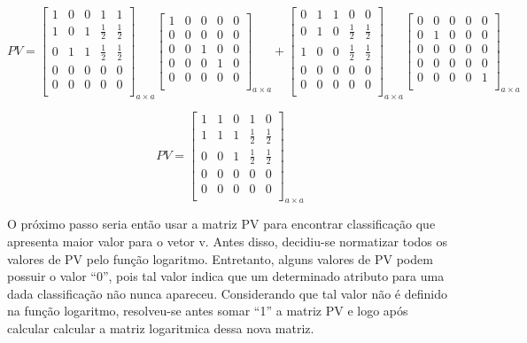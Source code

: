 \begin{anexosenv}
$$PV=
\left[
\begin{array}{ccccc}
1 & 0 & 0 & 1 & 1 \\
1 & 0 & 1 & \frac{1}{2} & \frac{1}{2} \\
0 & 1 & 1 & \frac{1}{2} & \frac{1}{2} \\
0 & 0 & 0 & 0 & 0 \\
0 & 0 & 0 & 0 & 0 \\
\end{array}
\right]_{a \times a}
\left[
\begin{array}{ccccc}
1 & 0 & 0 & 0 & 0 \\
0 & 0 & 0 & 0 & 0 \\
0 & 0 & 1 & 0 & 0 \\
0 & 0 & 0 & 1 & 0 \\
0 & 0 & 0 & 0 & 0 \\
\end{array}
\right]_{a \times a}
+
\left[
\begin{array}{ccccc}
0 & 1 & 1 & 0 & 0 \\
0 & 1 & 0 & \frac{1}{2} & \frac{1}{2} \\
1 & 0 & 0 & \frac{1}{2} & \frac{1}{2} \\
0 & 0 & 0 & 0 & 0 \\
0 & 0 & 0 & 0 & 0 \\
\end{array}
\right]_{a \times a}
\left[
\begin{array}{ccccc}
0 & 0 & 0 & 0 & 0 \\
0 & 1 & 0 & 0 & 0 \\
0 & 0 & 0 & 0 & 0 \\
0 & 0 & 0 & 0 & 0 \\
0 & 0 & 0 & 0 & 1 \\
\end{array}
\right]_{a \times a}
$$

$$PV=\left[
\begin{array}{ccccc}
1 & 1 & 0 & 1 & 0 \\
1 & 1 & 1 & \frac{1}{2} & \frac{1}{2} \\
0 & 0 & 1 & \frac{1}{2} & \frac{1}{2} \\
0 & 0 & 0 & 0 & 0 \\
0 & 0 & 0 & 0 & 0 \\
\end{array}
\right]_{a \times a}$$

O próximo passo seria então usar a matriz PV para encontrar classificação que
apresenta maior valor para o vetor v. Antes disso, decidiu-se normatizar todos
os valores de PV pelo função logaritmo. Entretanto, alguns valores de PV podem
possuir o valor ``0'', pois tal valor indica que um determinado atributo para
uma dada classificação não nunca apareceu. Considerando que tal valor não é
definido na função logaritmo, resolveu-se antes somar ``1'' a matriz PV e logo
após calcular calcular a matriz logaritmica dessa nova matriz.


\end{anexosenv}
